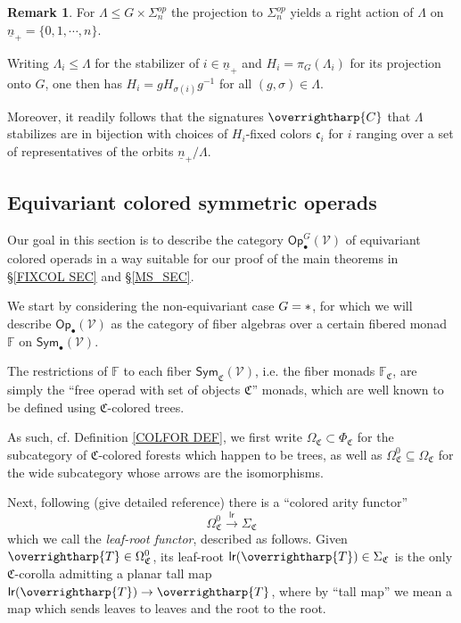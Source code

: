 \documentclass[a4paper,10pt
,draft
]{article}%
\numberwithin{equation}{section}
\numberwithin{figure}{section}
\theoremstyle{definition} %
\newtheorem{remark}[equation]{Remark}%
\newcommand{\vect}[1]{\text{\overrightharp{\ensuremath{#1}}}}
\newcommand{\V}{\ensuremath{\mathcal V}}
\newcommand{\1}{\ensuremath{\mathbbm 1}}%
\begin{document}
\begin{remark}\label{CHOOSESIGN REM}
For $\Lambda \leq G \times \Sigma_n^{op}$ 
the projection to $\Sigma_n^{op}$ yields a
right action of $\Lambda$ on 
$\underline{n}_+ = \{0,1,\cdots,n\}$.

Writing $\Lambda_i\leq \Lambda$ for the stabilizer of $i \in \underline{n}_{+}$ and $H_i = \pi_G(\Lambda_i)$
for its projection onto $G$,
one then has $H_i = g H_{\sigma(i)} g^{-1}$ for all
$(g, \sigma) \in \Lambda$.

Moreover, it readily follows that the 
signatures $\vect{C}$ that $\Lambda$ stabilizes
are in bijection with choices of 
$H_i$-fixed colors $\mathfrak{c}_i$ 
for $i$ ranging over a set of representatives of
the orbits $\underline{n}_+ /\Lambda$.
\end{remark}




\subsection{Equivariant colored symmetric operads}
\label{EQCOSYMOP SEC}

Our goal in this section is to describe the category 
$\mathsf{Op}^{G}_{\bullet}(\V)$
of equivariant colored operads in a way suitable for our 
proof of the main theorems in \S \ref{FIXCOL SEC} and \S \ref{MS_SEC}.

We start by considering the non-equivariant case
$G = \**$,
for which we will describe
$\mathsf{Op}_{\bullet}(\V)$
as the category of fiber algebras over a certain fibered monad $\mathbb{F}$ on 
$\mathsf{Sym}_\bullet(\mathcal{V})$.

The restrictions of $\mathbb{F}$ to each fiber
$\mathsf{Sym}_{\mathfrak{C}}(\V)$,
i.e. the fiber monads $\mathbb{F}_{\mathfrak{C}}$,
are simply the ``free operad with set of objects $\mathfrak{C}$'' monads,
which are well known to be defined using 
$\mathfrak{C}$-colored trees.

As such, cf. Definition \ref{COLFOR DEF},
we first write 
$\Omega_{\mathfrak{C}} \subset \Phi_{\mathfrak{C}}$
for the subcategory of $\mathfrak{C}$-colored forests which happen to be trees,
as well as 
$\Omega^0_{\mathfrak{C}} \subseteq \Omega_{\mathfrak{C}}$
for the wide subcategory whose arrows are the isomorphisms.



Next, following {\color{red} \cite{BP_geo} (give detailed reference)}
there is a ``colored arity functor''
\begin{equation}\label{LRDEF EQ}
\Omega_{\mathfrak{C}}^0 \xrightarrow{\mathsf{lr}} \Sigma_{\mathfrak{C}}
\end{equation}
which we call the \emph{leaf-root functor}, described as follows.
Given $\vect{T} \in \Omega^0_{\mathfrak{C}}$, 
its leaf-root
$\mathsf{lr}(\vect{T}) \in \Sigma_{\mathfrak{C}}$
is the only $\mathfrak{C}$-corolla
admitting a planar tall map
$\mathsf{lr}(\vect{T}) \to \vect{T}$,
where by ``tall map'' we mean a map
which sends leaves to leaves and the root to the root.
\end{document}
